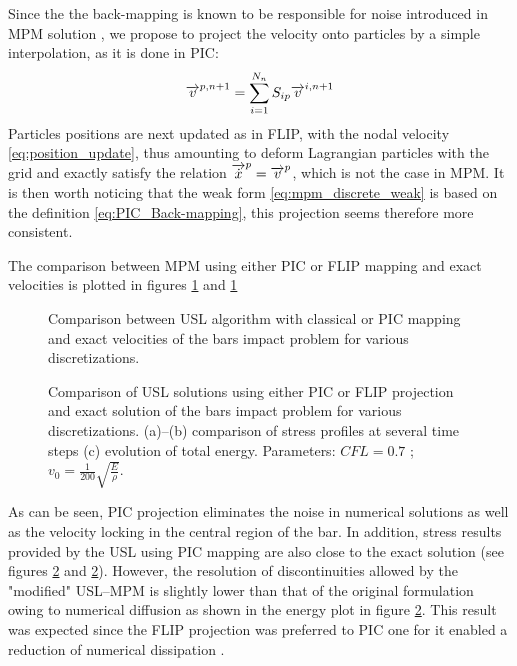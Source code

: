 Since the the back-mapping is known to be responsible for noise introduced in MPM solution \cite{Mass_Flip}, we propose to project the velocity onto particles by a simple interpolation, as it is done in PIC:
\begin{equation}
  \label{eq:PIC_Back-mapping}
  {\overrightarrow{v}}^{p,n+1}=\sum_{i=1}^{N_n} S_{ip}{\overrightarrow{v}}^{i,n+1}
\end{equation}
Particles positions are next updated as in FLIP, with the nodal velocity \eqref{eq:position_update}, thus amounting to deform Lagrangian particles with the grid and exactly satisfy the relation ${\overrightarrow{\dot{x}}}^p={\overrightarrow{v}}^p$, which is not the case in MPM. It is then worth noticing that the weak form \eqref{eq:mpm_discrete_weak} is based on the definition \eqref{eq:PIC_Back-mapping}, this projection seems therefore more consistent.

The comparison between MPM using either PIC or FLIP mapping and exact velocities is plotted in figures \ref{fig:MPM_velocities} and \ref{fig:MPM_velocities}
\begin{figure}[h!]
  \centering
  { \label{subfig:MPM_velo_10}}
  { \label{subfig:MPM_velo_25}}
  \caption{Comparison between USL algorithm with classical or PIC mapping and exact velocities of the bars impact problem for various discretizations.}
  \label{fig:MPM_velocities}
\end{figure}
\begin{figure}[h!]
  \centering
  {  \label{subfig:mpm_diffusion_10}}
  {  \label{subfig:mpm_diffusion_25}}
  {  \label{subfig:mpm_energies}}
  \caption{Comparison of USL solutions using either PIC or FLIP projection and exact solution of the bars impact problem for various discretizations. (a)--(b) comparison of stress profiles at several time steps (c) evolution of total energy. Parameters: $CFL=0.7$ ; $v_0=\frac{1}{200}\sqrt{\frac{E}{\rho}}$.}
  \label{fig:mpm_diffusion}
\end{figure}
As can be seen, PIC projection eliminates the noise in numerical solutions as well as the velocity locking in the central region of the bar. In addition, stress results provided by the USL using PIC mapping are also close to the exact solution (see figures \ref{fig:mpm_diffusion} and \ref{fig:mpm_diffusion}). However, the resolution of discontinuities allowed by the "modified" USL--MPM is slightly lower than that of the original formulation owing to numerical diffusion as shown in the energy plot in figure \ref{fig:mpm_diffusion}. This result was expected since the FLIP projection was preferred to PIC one for it enabled a reduction of numerical dissipation \cite{PIC_Nishiguchi}.

